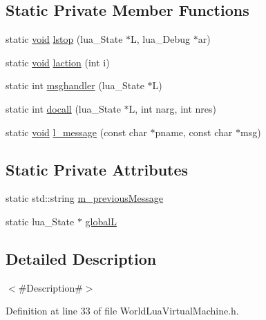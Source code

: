 \subsection*{Static Private Member Functions}
\begin{DoxyCompactItemize}
\item 
static \mbox{\hyperlink{_thread_8h_af1e856da2e658414cb2456cb6f7ebc66}{void}} \mbox{\hyperlink{classnjli_1_1_world_lua_virtual_machine_abd4e5bf538e5f1a0ad8d6309b199d4a4}{lstop}} (lua\+\_\+\+State $\ast$L, lua\+\_\+\+Debug $\ast$ar)
\item 
static \mbox{\hyperlink{_thread_8h_af1e856da2e658414cb2456cb6f7ebc66}{void}} \mbox{\hyperlink{classnjli_1_1_world_lua_virtual_machine_a84c29e3d8208c634419d1974c63ad245}{laction}} (int i)
\item 
static int \mbox{\hyperlink{classnjli_1_1_world_lua_virtual_machine_a3bf7729fa29a8e83715d34aa2332bdfd}{msghandler}} (lua\+\_\+\+State $\ast$L)
\item 
static int \mbox{\hyperlink{classnjli_1_1_world_lua_virtual_machine_a0a8abcf8b42eec41fa76dcaba191fbda}{docall}} (lua\+\_\+\+State $\ast$L, int narg, int nres)
\item 
static \mbox{\hyperlink{_thread_8h_af1e856da2e658414cb2456cb6f7ebc66}{void}} \mbox{\hyperlink{classnjli_1_1_world_lua_virtual_machine_aec5b70c9d15f38ca79a5f2a803152196}{l\+\_\+message}} (const char $\ast$pname, const char $\ast$msg)
\end{DoxyCompactItemize}
\subsection*{Static Private Attributes}
\begin{DoxyCompactItemize}
\item 
static std\+::string \mbox{\hyperlink{classnjli_1_1_world_lua_virtual_machine_ac786f57d118424a273a1e04f9a0d6c53}{m\+\_\+previous\+Message}}
\item 
static lua\+\_\+\+State $\ast$ \mbox{\hyperlink{classnjli_1_1_world_lua_virtual_machine_a510bd0513272a37d5837555719f658de}{globalL}}
\end{DoxyCompactItemize}


\subsection{Detailed Description}
$<$\#\+Description\#$>$ 

Definition at line 33 of file World\+Lua\+Virtual\+Machine.\+h.



